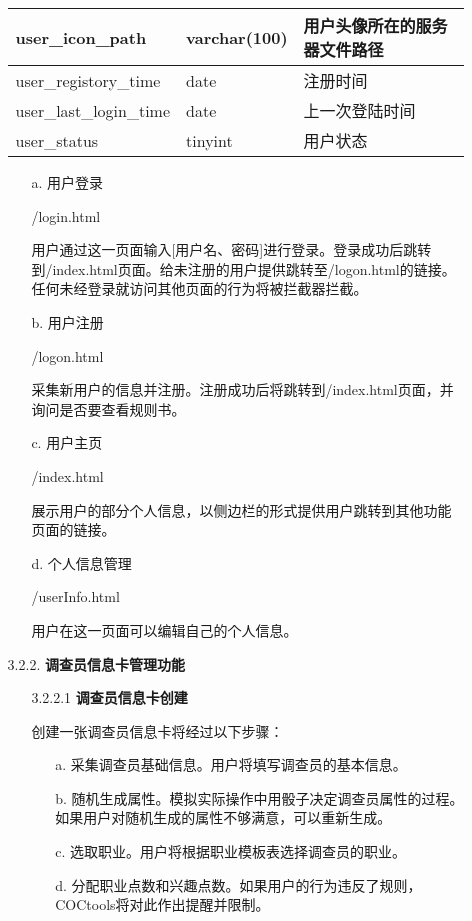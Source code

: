 \documentclass[a4paper,UTF8]{article}
\theoremstyle{definition}
\begin{document}
\begin{CJK}{UTF8}{gkai}
\begin{enumerate}
\begin{enumerate}
\begin{longtable}{|l|l|l|}
		user\_icon\_path        & {\color[HTML]{717171} varchar(100)} & 用户头像所在的服务器文件路径 \\ \hline
		user\_registory\_time   & {\color[HTML]{717171} date}         & 注册时间           \\ \hline
		user\_last\_login\_time & {\color[HTML]{717171} date}         & 上一次登陆时间        \\ \hline
		user\_status            & {\color[HTML]{717171} tinyint}      & 用户状态           \\ \hline
		\end{longtable}
	
		\begin{enumerate}
			\item[a.] 用户登录
			\par /login.html
			\par 用户通过这一页面输入[用户名、密码]进行登录。登录成功后跳转到/index.html页面。给未注册的用户提供跳转至/logon.html的链接。任何未经登录就访问其他页面的行为将被拦截器拦截。
			\item[b.] 用户注册
			\par /logon.html
			\par 采集新用户的信息并注册。注册成功后将跳转到/index.html页面，并询问是否要查看规则书。
			\item[c.] 用户主页
			\par /index.html
			\par 展示用户的部分个人信息，以侧边栏的形式提供用户跳转到其他功能页面的链接。
			\item[d.] 个人信息管理
			\par /userInfo.html
			\par 用户在这一页面可以编辑自己的个人信息。
		\end{enumerate}
		\item[3.2.2.] \textbf{调查员信息卡管理功能}
			\begin{enumerate}
			\item[3.2.2.1] \textbf{调查员信息卡创建}
			\par 创建一张调查员信息卡将经过以下步骤：
			\begin{enumerate}
				\item[a.] 采集调查员基础信息。用户将填写调查员的基本信息。
				\item[b.] 随机生成属性。模拟实际操作中用骰子决定调查员属性的过程。如果用户对随机生成的属性不够满意，可以重新生成。
				\item[c.] 选取职业。用户将根据职业模板表选择调查员的职业。
				\item[d.] 分配职业点数和兴趣点数。如果用户的行为违反了规则，COCtools将对此作出提醒并限制。

\end{enumerate}
\end{enumerate}
\end{enumerate}
\end{enumerate}
\end{CJK}
\end{document}
